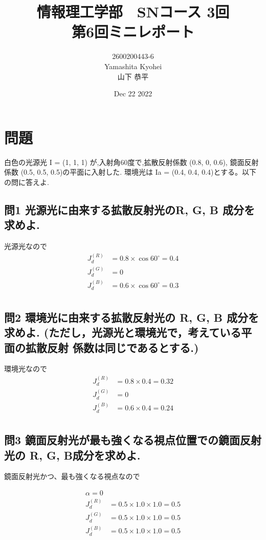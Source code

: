 \documentclass[dvipdfmx,autodetect-engine,titlepage]{jsarticle}
\title{情報理工学部　SNコース 3回\\
第6回ミニレポート\\}
\author{2600200443-6\\Yamashita Kyohei\\山下 恭平}
\date{Dec 22 2022}
\begin{document}
\maketitle

\section*{問題}
白色の光源光 I = (1, 1, 1) が,入射角60度で,拡散反射係数 (0.8, 0, 0.6), 鏡面反射係数 (0.5, 0.5, 0.5)の平面に入射した. 環境光は Ia = (0.4, 0.4, 0.4)とする。以下の問に答えよ.

\subsection*{問1 光源光に由来する拡散反射光のR, G, B 成分を求めよ.}

光源光なので
\begin{align*}
  J_d^{(R)} &= 0.8 \times \cos 60^\circ = 0.4 \\
  J_d^{(G)} &= 0 \\
  J_d^{(B)} &= 0.6 \times \cos 60^\circ = 0.3 \\
\end{align*}

\subsection*{問2 環境光に由来する拡散反射光の R, G, B 成分を求めよ. (ただし，光源光と環境光で，考えている平面の拡散反射 係数は同じであるとする.)}

環境光なので
\begin{align*}
  J_d^{(R)} &= 0.8 \times 0.4 = 0.32 \\
  J_d^{(G)} &= 0 \\
  J_d^{(B)} &= 0.6 \times 0.4= 0.24 \\
\end{align*}

\subsection*{問3 鏡面反射光が最も強くなる視点位置での鏡面反射光の R, G, B成分を求めよ.}

鏡面反射光かつ、最も強くなる視点なので

\begin{align*}
  \alpha = 0 \\
  J_d^{(R)} &= 0.5 \times 1.0 \times 1.0 = 0.5 \\
  J_d^{(G)} &= 0.5 \times 1.0 \times 1.0 = 0.5 \\
  J_d^{(B)} &= 0.5 \times 1.0 \times 1.0 = 0.5 \\
\end{align*}
\end{document}

